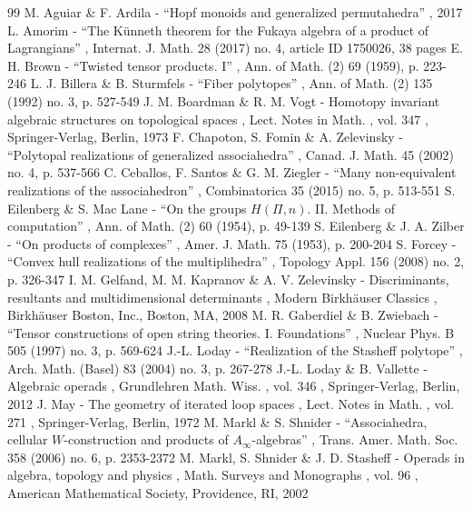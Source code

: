 \documentclass[10pt,a4paper]{amsart}
\numberwithin{equation}{section}\providecommand{\No}{}
\theoremstyle{plain}
\theoremstyle{definition}
\begin{document}
\begin{thebibliography}{99}
 M. Aguiar \& F. Ardila - “Hopf monoids and generalized permutahedra” , 2017
 L. Amorim - “The Künneth theorem for the Fukaya algebra of a product of Lagrangians” , Internat. J. Math. 28 (2017) no. 4, article ID 1750026, 38 pages
 E. H. Brown - “Twisted tensor products. I” , Ann. of Math. (2) 69 (1959), p. 223-246
 L. J. Billera \& B. Sturmfels - “Fiber polytopes” , Ann. of Math. (2) 135 (1992) no. 3, p. 527-549
 J. M. Boardman \& R. M. Vogt - Homotopy invariant algebraic structures on topological spaces , Lect. Notes in Math. , vol. 347 , Springer-Verlag, Berlin, 1973
 F. Chapoton, S. Fomin \& A. Zelevinsky - “Polytopal realizations of generalized associahedra” , Canad. J. Math. 45 (2002) no. 4, p. 537-566
 C. Ceballos, F. Santos \& G. M. Ziegler - “Many non-equivalent realizations of the associahedron” , Combinatorica 35 (2015) no. 5, p. 513-551
 S. Eilenberg \& S. Mac Lane - “On the groups $H(\Pi ,n)$. II. Methods of computation” , Ann. of Math. (2) 60 (1954), p. 49-139
 S. Eilenberg \& J. A. Zilber - “On products of complexes” , Amer. J. Math. 75 (1953), p. 200-204
 S. Forcey - “Convex hull realizations of the multiplihedra” , Topology Appl. 156 (2008) no. 2, p. 326-347
 I. M. Gelfand, M. M. Kapranov \& A. V. Zelevinsky - Discriminants, resultants and multidimensional determinants , Modern Birkhäuser Classics , Birkhäuser Boston, Inc., Boston, MA, 2008
 M. R. Gaberdiel \& B. Zwiebach - “Tensor constructions of open string theories. I. Foundations” , Nuclear Phys. B 505 (1997) no. 3, p. 569-624
 J.-L. Loday - “Realization of the Stasheff polytope” , Arch. Math. (Basel) 83 (2004) no. 3, p. 267-278
 J.-L. Loday \& B. Vallette - Algebraic operads , Grundlehren Math. Wiss. , vol. 346 , Springer-Verlag, Berlin, 2012
 J. May - The geometry of iterated loop spaces , Lect. Notes in Math. , vol. 271 , Springer-Verlag, Berlin, 1972
 M. Markl \& S. Shnider - “Associahedra, cellular $W$-construction and products of $A_\infty $-algebras” , Trans. Amer. Math. Soc. 358 (2006) no. 6, p. 2353-2372
 M. Markl, S. Shnider \& J. D. Stasheff - Operads in algebra, topology and physics , Math. Surveys and Monographs , vol. 96 , American Mathematical Society, Providence, RI, 2002

\end{thebibliography}
\end{document}

